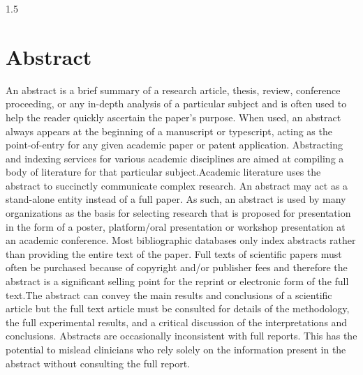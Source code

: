 
\newpage
{}
\thispagestyle{empty}
%
\begin{spacing}{1.5}
%
\chapter*{Abstract}


An abstract is a brief summary of a research article, thesis, review, conference proceeding, or any in-depth analysis of a particular subject and is often used to help the reader quickly ascertain the paper's purpose. When used, an abstract always appears at the beginning of a manuscript or typescript, acting as the point-of-entry for any given academic paper or patent application. Abstracting and indexing services for various academic disciplines are aimed at compiling a body of literature for that particular subject.Academic literature uses the abstract to succinctly communicate complex research. An abstract may act as a stand-alone entity instead of a full paper. As such, an abstract is used by many organizations as the basis for selecting research that is proposed for presentation in the form of a poster, platform/oral presentation or workshop presentation at an academic conference. Most bibliographic databases only index abstracts rather than providing the entire text of the paper. Full texts of scientific papers must often be purchased because of copyright and/or publisher fees and therefore the abstract is a significant selling point for the reprint or electronic form of the full text.The abstract can convey the main results and conclusions of a scientific article but the full text article must be consulted for details of the methodology, the full experimental results, and a critical discussion of the interpretations and conclusions. Abstracts are occasionally inconsistent with full reports. This has the potential to mislead clinicians who rely solely on the information present in the abstract without consulting the full report.






\end{spacing}